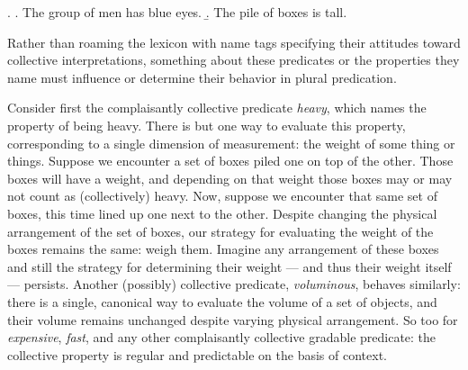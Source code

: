\documentclass[linguex]{sp}
\begin{document}
\ex. \a. The group of men has blue eyes. 
\b. The pile of boxes is tall.

Rather than roaming the lexicon with name tags specifying their attitudes toward collective interpretations, something about these predicates or the properties they name must influence or determine their behavior in plural predication.


Consider first the complaisantly collective predicate \emph{heavy}, which names the property of being heavy. There is but one way to evaluate this property, corresponding to a single dimension of measurement: the weight of some thing or things. Suppose we encounter a set of boxes piled one on top of the other. Those boxes will have a weight, and depending on that weight those boxes may or may not count as (collectively) heavy. Now, suppose we encounter that same set of boxes, this time lined up one next to the other. Despite changing the physical arrangement of the set of boxes, our strategy for evaluating the weight of the boxes remains the same: weigh them. Imagine any arrangement of these boxes and still the strategy for determining their weight --- and thus their weight itself --- persists. Another (possibly) collective predicate, \emph{voluminous}, behaves similarly: there is a single, canonical way to evaluate the volume of a set of objects, and their volume remains unchanged despite varying physical arrangement. So too for \emph{expensive}, \emph{fast}, and any other  complaisantly collective gradable predicate: the collective property is regular and predictable on the basis of context.
\end{document}
